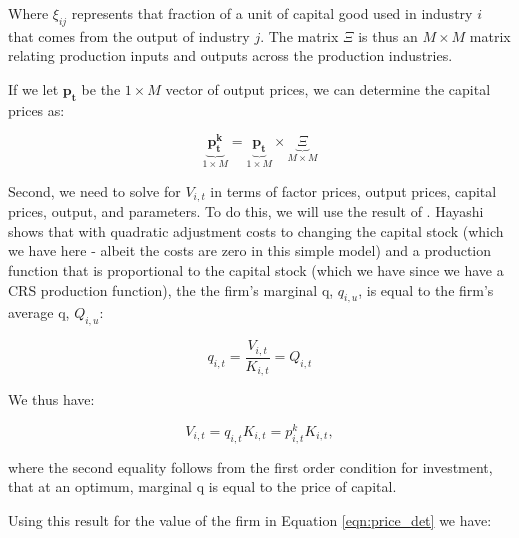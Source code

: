 \documentclass[letterpaper,12pt]{article}
\theoremstyle{definition}
\begin{document}
\begin{spacing}{1.5}
Where $\xi_{ij}$ represents that fraction of a unit of capital good used in industry $i$ that comes from the output of industry $j$.  The matrix $\Xi$ is thus an $M\times M$ matrix relating production inputs and outputs across the production industries.

  If we let $\boldsymbol{p_{t}}$ be the $1\times M$ vector of output prices, we can determine the capital prices as:

\begin{equation}
\label{eqn:capital_prices}
\underbrace{\boldsymbol{p^{k}_{t}}}_{1\times M} =\underbrace{\boldsymbol{p_{t}}}_{1\times M} \times  \underbrace{\Xi}_{M\times M}
\end{equation}

Second, we need to solve for $V_{i,t}$ in terms of factor prices, output prices, capital prices, output, and parameters.  To do this, we will use the result of \citet{Hayashi1982}.  Hayashi shows that with quadratic adjustment costs to changing the capital stock (which we have here - albeit the costs are zero in this simple model) and a production function that is proportional to the capital stock (which we have since we have a CRS production function), the the firm's marginal q, $q_{i,u}$, is equal to the firm's average q, $Q_{i,u}$:

\begin{equation}
q_{i,t} = \frac{V_{i,t}}{K_{i,t}} = Q_{i,t} 
\end{equation}

We thus have:

\begin{equation}
\label{eqn:solve_v1}
V_{i,t} = q_{i,t}K_{i,t} =p^{k}_{i,t}K_{i,t},
\end{equation}

\noindent\noindent where the second equality follows from the first order condition for investment, that at an optimum, marginal q is equal to the price of capital.


Using this result for the value of the firm in Equation \ref{eqn:price_det} we have:


\end{spacing}
\end{document}
